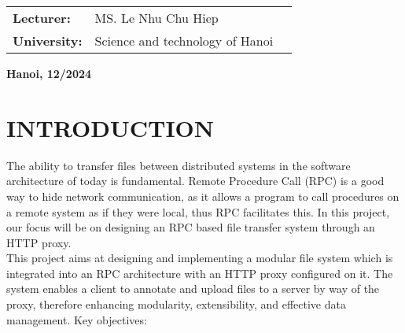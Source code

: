 \documentclass{article}
\begin{document}
\begin{table}[H]
    \centering
        \begin{tabular}{l l c}
            \textbf{Lecturer:}    &  MS. Le Nhu Chu Hiep \vspace{6pt} &  \\
            \textbf{University:} & Science and technology of Hanoi
        \end{tabular}
\end{table}

\begin{center}
    \vspace{5pt}
    \fontsize{14pt}{0pt}\selectfont{} \textbf{Hanoi, 12/2024}
\end{center}

\thispagestyle{empty}
    \newpage

\thispagestyle{empty}
    \newpage

\tableofcontents 
    \thispagestyle{empty}
        \newpage
            \thispagestyle{empty}
                \newpage


\section{INTRODUCTION} %
The ability to transfer files between distributed systems in the software architecture of today is fundamental. Remote Procedure Call (RPC) is a good way to hide network communication, as it allows a program to call procedures on a remote system as if they were local, thus RPC facilitates this. In this project, our focus will be on designing an RPC based file transfer system through an HTTP proxy. \\

This project aims at designing and implementing a modular file system which is integrated into an RPC architecture with an HTTP proxy configured on it. The system enables a client to annotate and upload files to a server by way of the proxy, therefore enhancing modularity, extensibility, and effective data management. Key objectives:
\end{document}
